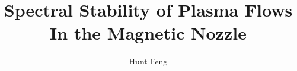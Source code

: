 \documentclass{uofsthesis-cs}
\title{Spectral Stability of Plasma Flows In the Magnetic Nozzle}
\author{Hunt Feng}
\theoremstyle{plain}
\theoremstyle{definition}
\begin{document}
\maketitle

\frontmatter









%
% 
% 
%










% 
% 




%

\uofsappendix

\begin{appendices}
	
\end{appendices}
\end{document}
